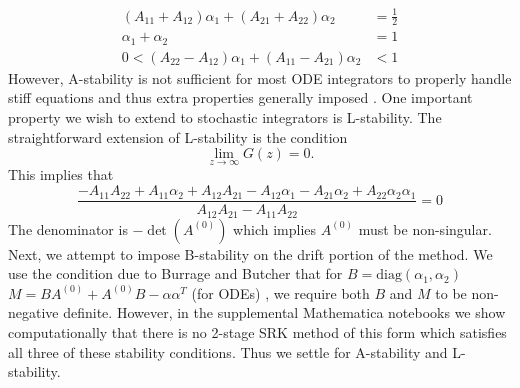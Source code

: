 \documentclass{article}
\begin{document}
\begin{align}
\left(A_{11}+A_{12}\right)\alpha_{1}+\left(A_{21}+A_{22}\right)\alpha_{2} & =\frac{1}{2}\label{eq:SRA_stab2_conds}\\
\alpha_{1}+\alpha_{2} & =1\nonumber \\
0<\left(A_{22}-A_{12}\right)\alpha_{1}+\left(A_{11}-A_{21}\right)\alpha_{2} & <1\nonumber
\end{align}
However, A-stability is not sufficient for most ODE integrators to
properly handle stiff equations and thus extra properties generally
imposed \cite{RN3790}. One important property we wish to extend to
stochastic integrators is L-stability. The straightforward extension
of L-stability is the condition
\begin{equation}
\lim_{z\rightarrow\infty}G(z)=0.\label{eq:SRA_L}
\end{equation}
This implies that
\begin{equation}
\frac{-A_{11}A_{22}+A_{11}\alpha_{2}+A_{12}A_{21}-A_{12}\alpha_{1}-A_{21}\alpha_{2}+A_{22}\alpha_{2}\alpha_{1}}{A_{12}A_{21}-A_{11}A_{22}}=0\label{eq:SRA_Lcond}
\end{equation}
The denominator is $-\det(A^{(0)})$ which implies $A^{(0)}$ must
be non-singular. Next, we attempt to impose B-stability on the drift
portion of the method. We use the condition due to Burrage and Butcher
that for $B=\text{diag}\left(\alpha_{1},\alpha_{2}\right)$ $M=BA^{(0)}+A^{(0)}B-\alpha\alpha^{T}$
(for ODEs) \cite{RN3791}, we require both $B$ and $M$ to be non-negative
definite. However, in the supplemental Mathematica notebooks we show
computationally that there is no 2-stage SRK method of this form which
satisfies all three of these stability conditions. Thus we settle
for A-stability and L-stability.
\end{document}
